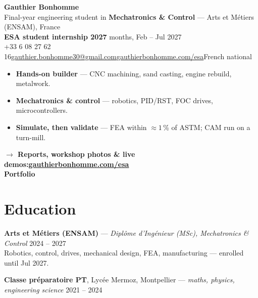 \documentclass[11pt,a4paper]{article}
\newcommand{\sep}{\enspace{\scriptsize\textbullet}\enspace}
\newcommand{\gap}{\par\vspace{0.85em}}
\providecommand{\cvtarget}{}
\begin{document}
\begin{center}
  {\fontsize{26}{30}\selectfont\bfseries Gauthier Bonhomme}\\[0.55em]
  Final-year engineering student in \textbf{Mechatronics \& Control} --- Arts et Métiers (ENSAM), France\\[0.3em]
  {\color{accent}\bfseries ESA student internship 2027\cvtarget}\sep 6 months, Feb -- Jul 2027\\[0.4em]
  {\small +33 6 08 27 62 16\sep\href{mailto:gauthier.bonhomme30@gmail.com}{gauthier.bonhomme30@gmail.com}\sep\href{https://gauthierbonhomme.com/esa}{gauthierbonhomme.com/esa}\sep French national}
\end{center}

\vspace{0.2em}
\begin{tcolorbox}[enhanced,colback=boxbg,colframe=boxbg,boxrule=0pt,arc=3pt,
  left=9pt,right=9pt,top=7pt,bottom=7pt,
  sidebyside,sidebyside align=center,lefthand ratio=0.84,sidebyside gap=8pt,segmentation hidden]
\begin{itemize}
  \item \textbf{Hands-on builder} --- CNC machining, sand casting, engine rebuild, metalwork.
  \item \textbf{Mechatronics \& control} --- robotics, PID/RST, FOC drives, microcontrollers.
  \item \textbf{Simulate, then validate} --- FEA within ${\approx}1$\,\% of ASTM; CAM run on a turn-mill.
\end{itemize}
\vspace{0.5em}
{\color{accent}\bfseries $\rightarrow$ Reports, workshop photos \& live demos:\enspace\href{https://gauthierbonhomme.com/esa}{gauthierbonhomme.com/esa}}
\tcblower
\centering
{}\\[3pt]
{\scriptsize\color{accent}\bfseries Portfolio}
\end{tcolorbox}

\section{Education}

\textbf{Arts et Métiers (ENSAM)} --- \textit{Diplôme d'Ingénieur (MSc), Mechatronics \& Control} \hfill 2024 -- 2027\\
Robotics, control, drives, mechanical design, FEA, manufacturing --- enrolled until Jul 2027.
\gap
\textbf{Classe préparatoire PT}, Lycée Mermoz, Montpellier --- \textit{maths, physics, engineering science} \hfill 2021 -- 2024
\end{document}
